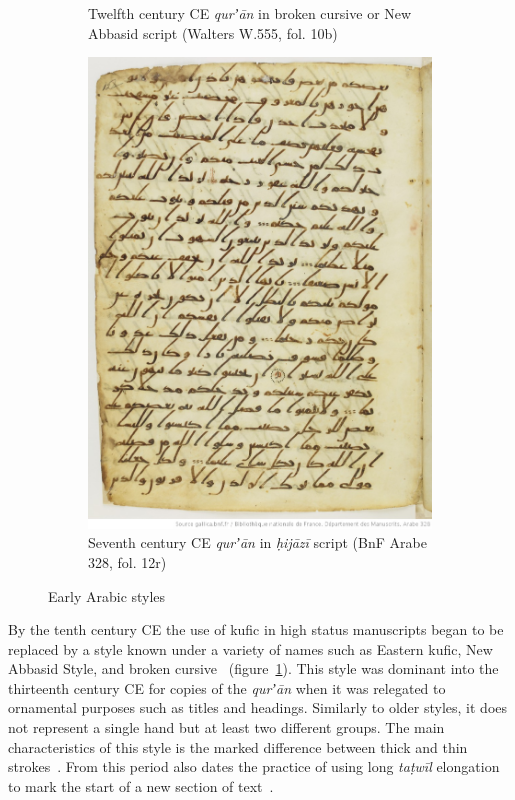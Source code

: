 \begin{figure}[h!tp]
\begin{subfigure}[t]{.4\textwidth}
		\caption{Twelfth century CE \emph{qurʼān} in broken cursive or New Abbasid script (Walters W.555, fol. 10b)}
                \label{fig:ara_broken}
        \end{subfigure}
	\hfill
	\begin{subfigure}[t]{.55\columnwidth}
		\centering
                \includegraphics[height=0.4\textheight]{images/Coran__btv1b8415207g_31.jpeg}
		\caption{Seventh century CE \emph{qurʼān} in \emph{ḥijāzī} script (BnF Arabe 328, fol. 12r)}
                \label{fig:ara_hijazi}
        \end{subfigure}
        \caption{Early Arabic styles}
\end{figure}

By the tenth century CE the use of kufic in high status manuscripts began to be
replaced by a style known under a variety of names such as Eastern kufic, New
Abbasid Style, and broken cursive~\cite[pg. 144]{blair2006islamic}
(figure~\ref{fig:ara_broken}). This style was dominant into the thirteenth
century CE for copies of the \emph{qurʼān} when it was relegated to ornamental
purposes such as titles and headings. Similarly to older styles, it does not
represent a single hand but at least two different groups. The main
characteristics of this style is the marked difference between thick and thin
strokes~\cite[pg. 167-168]{gacek2009arabic}. From this period also dates the
practice of using long \emph{taṭwīl} elongation to mark the start of a new
section of text~\cite[pg. 165]{blair2006islamic}.

